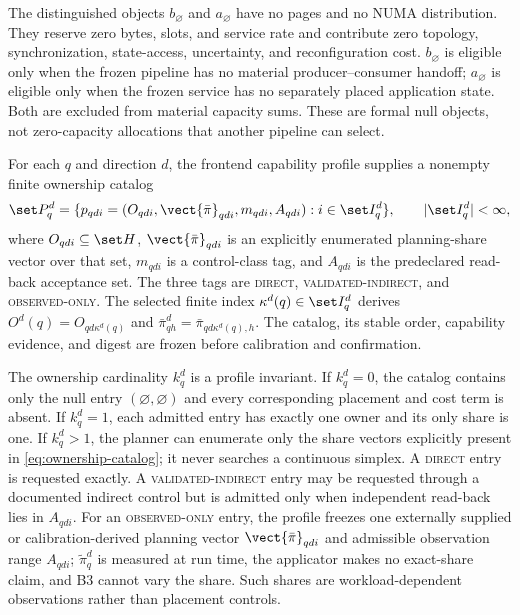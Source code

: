 The distinguished objects $b_\varnothing$ and $a_\varnothing$ have no pages and no NUMA distribution. They reserve zero bytes, slots, and service rate and contribute zero topology, synchronization, state-access, uncertainty, and reconfiguration cost. $b_\varnothing$ is eligible only when the frozen pipeline has no material producer--consumer handoff; $a_\varnothing$ is eligible only when the frozen service has no separately placed application state. Both are excluded from material capacity sums. These are formal null objects, not zero-capacity allocations that another pipeline can select.

For each $q$ and direction $d$, the frontend capability profile supplies a nonempty finite ownership catalog
\begin{equation}
 \set P_q^d=\{p_{qdi}=(O_{qdi},\vect{\bar\pi}_{qdi},
 m_{qdi},A_{qdi}):i\in\set I_q^d\},\qquad |\set I_q^d|<\infty,
 \label{eq:ownership-catalog}
\end{equation}
where $O_{qdi}\subseteq\set H$, $\vect{\bar\pi}_{qdi}$ is an explicitly enumerated planning-share vector over that set, $m_{qdi}$ is a control-class tag, and $A_{qdi}$ is the predeclared read-back acceptance set. The three tags are \textsc{direct}, \textsc{validated-indirect}, and \textsc{observed-only}. The selected finite index $\kappa^d(q)\in\set I_q^d$ derives $O^d(q)=O_{qd\kappa^d(q)}$ and $\bar\pi^d_{qh}=\bar\pi_{qd\kappa^d(q),h}$. The catalog, its stable order, capability evidence, and digest are frozen before calibration and confirmation.

The ownership cardinality $k_q^d$ is a profile invariant. If $k_q^d=0$, the catalog contains only the null entry $(\varnothing,\varnothing)$ and every corresponding placement and cost term is absent. If $k_q^d=1$, each admitted entry has exactly one owner and its only share is one. If $k_q^d>1$, the planner can enumerate only the share vectors explicitly present in \cref{eq:ownership-catalog}; it never searches a continuous simplex. A \textsc{direct} entry is requested exactly. A \textsc{validated-indirect} entry may be requested through a documented indirect control but is admitted only when independent read-back lies in $A_{qdi}$. For an \textsc{observed-only} entry, the profile freezes one externally supplied or calibration-derived planning vector $\vect{\bar\pi}_{qdi}$ and admissible observation range $A_{qdi}$; $\widetilde\pi^d_q$ is measured at run time, the applicator makes no exact-share claim, and B3 cannot vary the share. Such shares are workload-dependent observations rather than placement controls.

